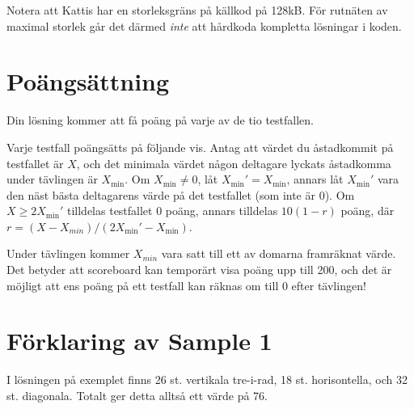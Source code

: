 Notera att Kattis har en storleksgräns på källkod på 128kB. För rutnäten av maximal storlek går det därmed
\emph{inte} att hårdkoda kompletta lösningar i koden.

\section*{Poängsättning}
Din lösning kommer att få poäng på varje av de tio testfallen.

Varje testfall poängsätts på följande vis.
Antag att värdet du åstadkommit på testfallet är $X$, och
det minimala värdet någon deltagare lyckats åstadkomma under tävlingen är $X_{\min}$.
Om $X_{\min} \ne 0$, låt $X_{\min}' = X_{\min}$, annars låt $X_{\min}'$ vara den näst bästa deltagarens värde på det testfallet (som inte är 0).
Om $X \ge 2X_{\min}'$ tilldelas testfallet $0$ poäng, annars tilldelas $10(1 - r)$ poäng, där $r = (X - X_{min}) / (2X_{\min}' - X_{\min})$.

Under tävlingen kommer $X_{min}$ vara satt till ett av domarna framräknat värde.
Det betyder att scoreboard kan temporärt visa poäng upp till 200, och det är möjligt att ens poäng på ett testfall kan räknas om till 0 efter tävlingen!

\section*{Förklaring av Sample 1}
I lösningen på exemplet finns 26 st. vertikala tre-i-rad, 18 st. horisontella, och 32 st. diagonala.
Totalt ger detta alltså ett värde på 76.
